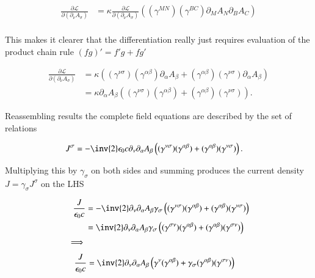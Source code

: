\documentclass{article}
\newcommand{\LL}[0]{\mathcal{L}}
\newcommand{\PD}[2]{\frac{\partial {#2}}{\partial {#1}}}
\newcommand{\gpgrade}[2] {{\left\langle{{#1}}\right\rangle}_{#2}}
\begin{document}
\begin{align*}
\PD{(\partial_\nu A_\sigma)}{\LL} 
&= \kappa \PD{(\partial_\nu A_\sigma)}{\LL} \left( (\gamma^{M N}) (\gamma^{B C}) \partial_M A_N \partial_B A_C \right) \\
\end{align*}

This makes it clearer that the differentiation really just requires evaluation of the product chain rule $(fg)' = f'g + f g'$

\begin{align*}
\PD{(\partial_\nu A_\sigma)}{\LL} 
&=
\kappa
\left(
(\gamma^{\nu\sigma}) (\gamma^{\alpha\beta}) \partial_\alpha A_\beta 
+(\gamma^{\alpha\beta}) (\gamma^{\nu\sigma}) \partial_\alpha A_\beta
\right) \\
&= \kappa \partial_\alpha A_\beta \left( (\gamma^{\nu\sigma}) (\gamma^{\alpha\beta}) +(\gamma^{\alpha\beta}) (\gamma^{\nu\sigma}) \right).
\end{align*}


Reassembling results the complete field equations are described by the set of relations

\begin{align*}
J^\sigma
&= -\inv{2} \epsilon_0 c \partial_\nu \partial_\alpha A_\beta
\left( (\gamma^{\nu\sigma}) (\gamma^{\alpha\beta}) +(\gamma^{\alpha\beta}) (\gamma^{\nu\sigma}) \right).
\end{align*}

Multiplying this by $\gamma_\sigma$ on both sides and summing produces the current density $J = \gamma_\sigma J^\sigma$ on the LHS

\begin{align*}
\frac{J}{\epsilon_0 c}
&= -\inv{2}
\partial_\nu \partial_\alpha A_\beta
\gamma_\sigma
\left( (\gamma^{\nu\sigma}) (\gamma^{\alpha\beta}) +(\gamma^{\alpha\beta}) (\gamma^{\nu\sigma}) \right) \\
&= \inv{2}
\partial_\nu \partial_\alpha A_\beta
\gamma_\sigma
\left( (\gamma^{\sigma\nu}) (\gamma^{\alpha\beta}) +(\gamma^{\alpha\beta}) (\gamma^{\sigma\nu}) \right) \\
\implies \\
\end{align*}
\begin{align}\label{eqn:gettingthere}
\frac{J}{\epsilon_0 c}
&= \inv{2}
\partial_\nu \partial_\alpha A_\beta
\left(
\gamma^{\nu} (\gamma^{\alpha\beta}) +
\gamma_\sigma (\gamma^{\alpha\beta}) (\gamma^{\sigma\nu})
\right)
\end{align}
\end{document}
